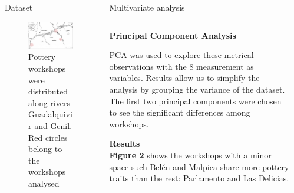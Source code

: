 \documentclass[final]{beamer}
\newlength{\sepwid}
\newlength{\onecolwid}
\newlength{\twocolwid}
\begin{document}
\begin{frame}[t]
\begin{columns}[t]
\begin{column}{\onecolwid}
\begin{block}{Dataset}
\begin{figure}
\includegraphics[width=0.7\linewidth]{images/fig1.png}
\caption{Pottery workshops were distributed along rivers Guadalquivir and Genil. Red circles belong to the workshops analysed}
\end{figure}


 \end{block}
\end{column} %

\begin{column}{\twocolwid}


\begin{block}{Multivariate analysis}
\begin{columns}[t,totalwidth=\twocolwid]



\begin{column}{\onecolwid} %


{\textbf{Principal Component Analysis}} 
\justify

PCA was used to explore these metrical observations with the 8 measurement as variables. Results allow us to simplify the analysis by grouping the variance of the dataset. The first two principal components were chosen to see the significant differences among workshops. 

\vspace{1cm}
{\textbf{Results}}\\
\justify
\textbf{Figure 2} shows the workshops with a minor space such Bel\'en and Malpica share more pottery traits than the rest: Parlamento and Las Delicias.


\end{column}

\begin{column}{\sepwid}\end{column} %


\end{columns}
\end{block}
\end{column}
\end{columns}
\end{frame}
\end{document}
